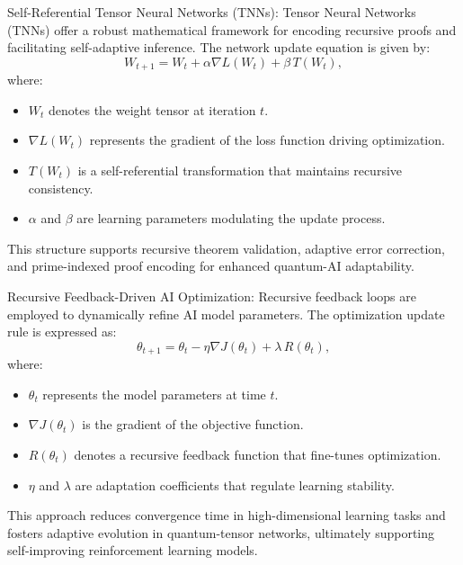 \pa Self-Referential Tensor Neural Networks (TNNs): Tensor Neural Networks (TNNs) offer a robust mathematical framework for encoding recursive proofs and facilitating self-adaptive inference. The network update equation is given by:
\begin{equation}
W_{t+1} = W_t + \alpha \nabla L(W_t) + \beta\, T(W_t),
\end{equation}
where:
\begin{itemize}
    \item \(W_t\) denotes the weight tensor at iteration \(t\).
    \item \(\nabla L(W_t)\) represents the gradient of the loss function driving optimization.
    \item \(T(W_t)\) is a self-referential transformation that maintains recursive consistency.
    \item \(\alpha\) and \(\beta\) are learning parameters modulating the update process.
\end{itemize}
This structure supports recursive theorem validation, adaptive error correction, and prime-indexed proof encoding for enhanced quantum-AI adaptability.

\pa Recursive Feedback-Driven AI Optimization: Recursive feedback loops are employed to dynamically refine AI model parameters. The optimization update rule is expressed as:
\begin{equation}
\theta_{t+1} = \theta_t - \eta \nabla J(\theta_t) + \lambda\, R(\theta_t),
\end{equation}
where:
\begin{itemize}
    \item \(\theta_t\) represents the model parameters at time \(t\).
    \item \(\nabla J(\theta_t)\) is the gradient of the objective function.
    \item \(R(\theta_t)\) denotes a recursive feedback function that fine-tunes optimization.
    \item \(\eta\) and \(\lambda\) are adaptation coefficients that regulate learning stability.
\end{itemize}
This approach reduces convergence time in high-dimensional learning tasks and fosters adaptive evolution in quantum-tensor networks, ultimately supporting self-improving reinforcement learning models.

